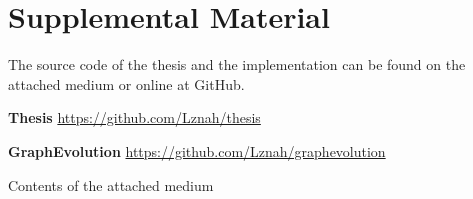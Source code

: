 \chapter{Supplemental Material}

The source code of the thesis and the implementation can be found on the attached medium or online at GitHub.

\noindent \textbf{Thesis} \hfill
    \url{https://github.com/Lznah/thesis}

\noindent \textbf{GraphEvolution} \hfill
    \url{https://github.com/Lznah/graphevolution}

\vfill

\begin{dirfigure}%
\caption{Contents of the attached medium}
\end{dirfigure}
